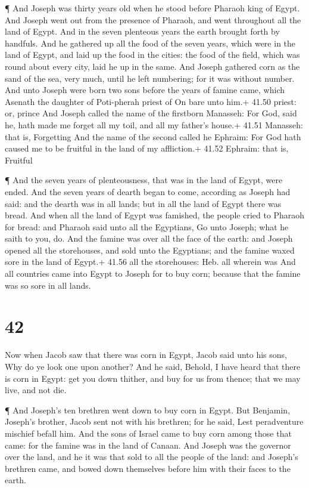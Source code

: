  ¶ And Joseph was thirty years old when he stood before
Pharaoh king of Egypt. And Joseph went out from the presence of Pharaoh,
and went throughout all the land of Egypt.  And in the
seven plenteous years the earth brought forth by handfuls. 
And he gathered up all the food of the seven years, which were in the
land of Egypt, and laid up the food in the cities: the food of the
field, which was round about every city, laid he up in the same.
 And Joseph gathered corn as the sand of the sea, very
much, until he left numbering; for it was without number. 
And unto Joseph were born two sons before the years of famine came,
which Asenath the daughter of Poti-pherah priest of On bare unto him.+
41.50 priest: or, prince  And Joseph called the name of the
firstborn Manasseh: For God, said he, hath made me forget all my toil,
and all my father's house.+ 41.51 Manasseh: that is, Forgetting
 And the name of the second called he Ephraim: For God hath
caused me to be fruitful in the land of my affliction.+ 41.52 Ephraim:
that is, Fruitful

 ¶ And the seven years of plenteousness, that was in the
land of Egypt, were ended.  And the seven years of dearth
began to come, according as Joseph had said: and the dearth was in all
lands; but in all the land of Egypt there was bread.  And
when all the land of Egypt was famished, the people cried to Pharaoh for
bread: and Pharaoh said unto all the Egyptians, Go unto Joseph; what he
saith to you, do.  And the famine was over all the face of
the earth: and Joseph opened all the storehouses, and sold unto the
Egyptians; and the famine waxed sore in the land of Egypt.+ 41.56 all
the storehouses: Heb. all wherein was  And all countries
came into Egypt to Joseph for to buy corn; because that the famine was
so sore in all lands.

\hypertarget{section-41}{%
\section{42}\label{section-41}}

 Now when Jacob saw that there was corn in Egypt, Jacob said
unto his sons, Why do ye look one upon another?  And he
said, Behold, I have heard that there is corn in Egypt: get you down
thither, and buy for us from thence; that we may live, and not die.

 ¶ And Joseph's ten brethren went down to buy corn in Egypt.
 But Benjamin, Joseph's brother, Jacob sent not with his
brethren; for he said, Lest peradventure mischief befall him.
 And the sons of Israel came to buy corn among those that
came: for the famine was in the land of Canaan.  And Joseph
was the governor over the land, and he it was that sold to all the
people of the land: and Joseph's brethren came, and bowed down
themselves before him with their faces to the earth.

